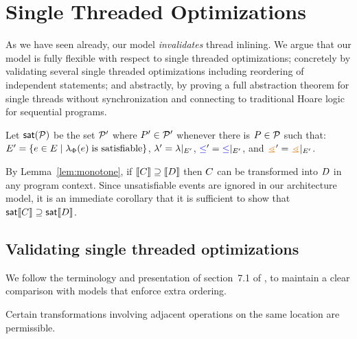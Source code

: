 \section{Single Threaded Optimizations}
\label{sec:opt}

As we have seen already, our model {\em invalidates} thread inlining.  We argue that our model is fully flexible with respect to single threaded optimizations; concretely by validating several 
single threaded optimizations including reordering of independent statements; and abstractly, by proving a full abstraction
theorem for single threads without synchronization and connecting to traditional Hoare logic for sequential programs. 



Let $\mathsf{sat}(\mathcal{P})$ be the set $\mathcal{P}'$ where $P'\in\mathcal{P}'$ whenever
there is $P\in\mathcal{P}$ such that:
$E' = \{e \in E\mid \lambda_{\Phi}(e)\;\text{is satisfiable}\}$,
${\lambda'} = {\lambda}\mathbin{|}_{E'}$, 
${\mathrel{{\color{blue}\leq}}'} = {\mathrel{{\color{blue}\leq}}}\mathbin{|}_{E'}$, and
${\gtN'} = {\gtN}\restrict{\Event'}$.

By Lemma~\ref{lem:monotone}, if $\llbracket C\rrbracket \supseteq \llbracket D\rrbracket$
then $C$ can be transformed into $D$ in any program context.  Since
unsatisfiable events are ignored in our architecture model, it is
an immediate corollary that it is sufficient to show that
$\mathsf{sat}\llbracket C\rrbracket \supseteq \mathsf{sat}\llbracket D\rrbracket$.



\subsection{Validating single threaded optimizations}
We follow the terminology and presentation of section~7.1 of
\citet{Dolan:2018:BDR:3192366.3192421}, to maintain a clear comparison with
models that enforce extra ordering.

Certain transformations involving adjacent operations on the same location
are permissible. 
 
